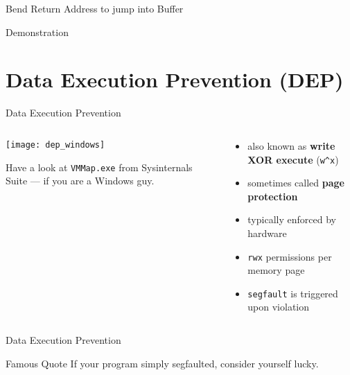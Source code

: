 \documentclass[beamer]{uibk}
\begin{document}
\begin{frame}{Bend Return Address to jump into Buffer}
    \begin{center}
        \huge Demonstration
    \end{center}
\end{frame}

\section{Data Execution Prevention (DEP)}

\begin{frame}{Data Execution Prevention}
    \begin{columns}
        \begin{column}{0.5\textwidth}
            \begin{center}
                \texttt{[image: dep\_windows]}
            \end{center}
            \medskip

            Have a look at \texttt{VMMap.exe} from Sysinternals Suite --- if
            you are a Windows guy.
        \end{column}
        \begin{column}{0.5\textwidth}
            \begin{itemize}
                \item also known as \textbf{write XOR execute} (\texttt{w\^{}x})
                \medskip
                \item sometimes called \textbf{page protection}
                \bigskip
                \item typically enforced by hardware
                \medskip
                \item \texttt{rwx} permissions per memory page
                \medskip
                \item \texttt{segfault} is triggered upon violation
            \end{itemize}
        \end{column}
    \end{columns}
\end{frame}

\begin{frame}{Data Execution Prevention}
    \begin{block}{Famous Quote}
        If your program simply segfaulted, consider yourself lucky.
    \end{block}
\end{frame}
\end{document}

